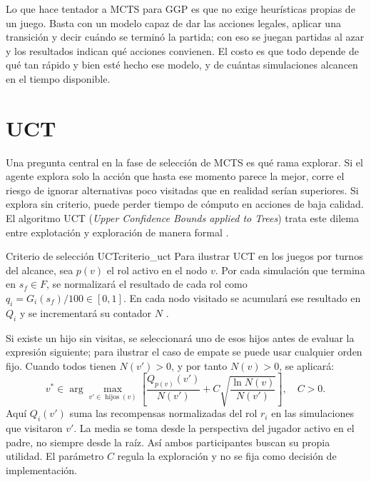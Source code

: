 Lo que hace tentador a MCTS para GGP es que no exige heurísticas propias de un juego. Basta con un modelo capaz de dar las acciones legales, aplicar una transición y decir cuándo se terminó la partida; con eso se juegan partidas al azar y los resultados indican qué acciones convienen. El costo es que todo depende de qué tan rápido y bien esté hecho ese modelo, y de cuántas simulaciones alcancen en el tiempo disponible.

\section{UCT}

Una pregunta central en la fase de selección de MCTS es qué rama explorar. Si el agente explora solo la acción que hasta ese momento parece la mejor, corre el riesgo de ignorar alternativas poco visitadas que en realidad serían superiores. Si explora sin criterio, puede perder tiempo de cómputo en acciones de baja calidad. El algoritmo UCT (\textit{Upper Confidence Bounds applied to Trees}) trata este dilema entre explotación y exploración de manera formal \cite{Kocsis2006UCT, Browne2012MCTS}.

\begin{definicion}{Criterio de selección UCT}{criterio_uct}
Para ilustrar UCT en los juegos por turnos del alcance, sea $p(v)$ el rol activo en el nodo $v$. Por cada simulación que termina en $s_f\in F$, se normalizará el resultado de cada rol como $q_i=G_i(s_f)/100\in[0,1]$. En cada nodo visitado se acumulará ese resultado en $Q_i$ y se incrementará su contador $N$ \cite{Kocsis2006UCT, Browne2012MCTS}.

Si existe un hijo sin visitas, se seleccionará uno de esos hijos antes de evaluar la expresión siguiente; para ilustrar el caso de empate se puede usar cualquier orden fijo. Cuando todos tienen $N(v')>0$, y por tanto $N(v)>0$, se aplicará:
\begin{equation}
    v^*\in\arg\max_{v'\in\operatorname{hijos}(v)}
    \left[\frac{Q_{p(v)}(v')}{N(v')}+C\sqrt{\frac{\ln N(v)}{N(v')}}\right],\quad C>0.
    \label{eq:seleccion-uct}
\end{equation}
Aquí $Q_i(v')$ suma las recompensas normalizadas del rol $r_i$ en las simulaciones que visitaron $v'$. La media se toma desde la perspectiva del jugador activo en el padre, no siempre desde la raíz. Así ambos participantes buscan su propia utilidad. El parámetro $C$ regula la exploración y no se fija como decisión de implementación.
\end{definicion}


